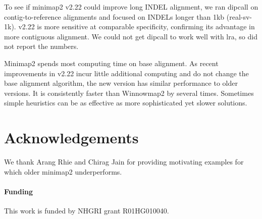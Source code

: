 \documentclass{bioinfo}
\begin{document}
To see if minimap2 v2.22 could improve long INDEL alignment, we ran dipcall on
contig-to-reference alignments and focused on INDELs longer than 1kb
(real-sv-1k). v2.22 is more sensitive at comparable specificity, confirming its
advantage in more contiguous alignment. We could not get dipcall to work well with lra,
so did not report the numbers.

Minimap2 spends most computing time on base alignment. As recent improvements
in v2.22 incur little additional computing and do not change the base alignment
algorithm, the new version has similar performance to older versions. It is
consistently faster than Winnowmap2 by several times. Sometimes simple
heuristics can be as effective as more sophisticated yet slower solutions.

\section*{Acknowledgements}
We thank Arang Rhie and Chirag Jain for providing motivating examples for which
older minimap2 underperforms.

\paragraph{Funding\textcolon} This work is funded by NHGRI grant R01HG010040.


\end{document}
